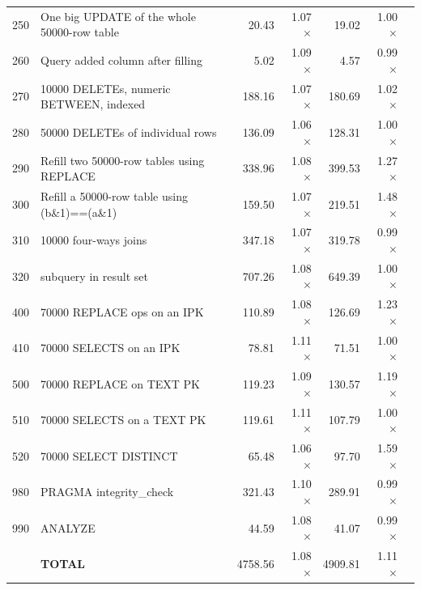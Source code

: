 \begin{table}[htbp]
\begin{tabular}{@{}llrrrrr@{}}
250 & One big UPDATE of the whole 50000-row table & 20.43 & 1.07$\times$ & 19.02 & 1.00$\times$ \\
260 & Query added column after filling & 5.02 & 1.09$\times$ & 4.57 & 0.99$\times$ \\
270 & 10000 DELETEs, numeric BETWEEN, indexed & 188.16 & 1.07$\times$ & 180.69 & 1.02$\times$ \\
280 & 50000 DELETEs of individual rows & 136.09 & 1.06$\times$ & 128.31 & 1.00$\times$ \\
290 & Refill two 50000-row tables using REPLACE & 338.96 & 1.08$\times$ & 399.53 & 1.27$\times$ \\
300 & Refill a 50000-row table using (b\&1)==(a\&1) & 159.50 & 1.07$\times$ & 219.51 & 1.48$\times$ \\
310 & 10000 four-ways joins & 347.18 & 1.07$\times$ & 319.78 & 0.99$\times$ \\
320 & subquery in result set & 707.26 & 1.08$\times$ & 649.39 & 1.00$\times$ \\
400 & 70000 REPLACE ops on an IPK & 110.89 & 1.08$\times$ & 126.69 & 1.23$\times$ \\
410 & 70000 SELECTS on an IPK & 78.81 & 1.11$\times$ & 71.51 & 1.00$\times$ \\
500 & 70000 REPLACE on TEXT PK & 119.23 & 1.09$\times$ & 130.57 & 1.19$\times$ \\
510 & 70000 SELECTS on a TEXT PK & 119.61 & 1.11$\times$ & 107.79 & 1.00$\times$ \\
520 & 70000 SELECT DISTINCT & 65.48 & 1.06$\times$ & 97.70 & 1.59$\times$ \\
980 & PRAGMA integrity\_check & 321.43 & 1.10$\times$ & 289.91 & 0.99$\times$ \\
990 & ANALYZE & 44.59 & 1.08$\times$ & 41.07 & 0.99$\times$ \\
\midrule
& \textbf{TOTAL} & 4758.56 & 1.08$\times$ & 4909.81 & 1.11$\times$ \\
\bottomrule
\end{tabular}
\end{table}
